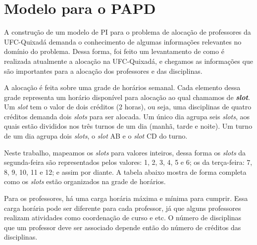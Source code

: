 \chapter{Modelo para o PAPD}
\label{cap:modelo-para-o-papd}

A construção de um modelo de PI para o problema de alocação de professores da UFC-Quixadá demanda o conhecimento de algumas informações relevantes no domínio do problema. Dessa forma, foi feito um levantamento de como é realizada atualmente a alocação na UFC-Quixadá, e chegamos as informações que são importantes para a alocação dos professores e das disciplinas. 

A alocação é feita sobre uma grade de horários semanal. Cada elemento dessa grade representa um horário disponível para alocação ao qual chamamos de \textbf{\textit{slot}}. Um \textit{slot} tem o valor de dois créditos (2 horas), ou seja, uma disciplinas de quatro créditos demanda dois \textit{slots} para ser alocada. Um único dia agrupa seis \textit{slots}, aos quais estão divididos nos três turnos de um dia (manhã, tarde e noite). Um turno de um dia agrupa dois \textit{slots}, o \textit{slot} AB e o \textit{slot} CD do turno. 

Neste trabalho, mapeamos os \textit{slots} para valores inteiros, dessa forma os \textit{slots} da segunda-feira são representados pelos valores: 1, 2, 3, 4, 5 e 6; os da terça-feira: 7, 8, 9, 10, 11 e 12; e assim por diante. A tabela abaixo mostra de forma completa como os \textit{slots} estão organizados na grade de horários.

\begin{figure}[htbp]
	\centering
\end{figure}


Para os professores, há uma carga horária máxima e mínima para cumprir. Essa carga horária pode ser diferente para cada professor, já que alguns professores realizam atividades como coordenação de curso e etc. O número de disciplinas que um professor deve ser associado depende então do número de créditos das disciplinas. 

